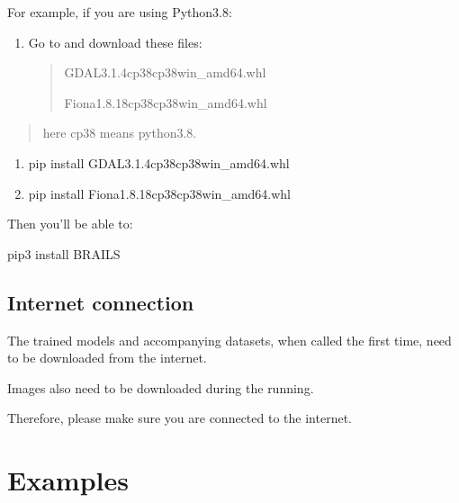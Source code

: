 \documentclass[letterpaper,10pt,english]{sphinxmanual}
\begin{document}
\sphinxAtStartPar
For example, if you are using Python3.8:
\begin{enumerate}
%
\item {} 
\sphinxAtStartPar
Go to  and download these files:
\begin{quote}

\sphinxAtStartPar
GDAL\sphinxhyphen{}3.1.4\sphinxhyphen{}cp38\sphinxhyphen{}cp38\sphinxhyphen{}win\_amd64.whl

\sphinxAtStartPar
Fiona\sphinxhyphen{}1.8.18\sphinxhyphen{}cp38\sphinxhyphen{}cp38\sphinxhyphen{}win\_amd64.whl
\end{quote}

\end{enumerate}
\begin{quote}

\sphinxAtStartPar
here cp38 means python3.8.
\end{quote}
\begin{enumerate}
%
\setcounter{enumi}{1}
\item {} 
\sphinxAtStartPar
pip install GDAL\sphinxhyphen{}3.1.4\sphinxhyphen{}cp38\sphinxhyphen{}cp38\sphinxhyphen{}win\_amd64.whl

\item {} 
\sphinxAtStartPar
pip install Fiona\sphinxhyphen{}1.8.18\sphinxhyphen{}cp38\sphinxhyphen{}cp38\sphinxhyphen{}win\_amd64.whl

\end{enumerate}

\sphinxAtStartPar
Then you’ll be able to:

\sphinxAtStartPar
pip3 install BRAILS


\subsection{Internet connection}
\label{\detokenize{common/user_manual/troubleshooting:internet-connection}}
\sphinxAtStartPar
The trained models and accompanying datasets, when called the first time, need to be downloaded from the internet.

\sphinxAtStartPar
Images also need to be downloaded during the running.

\sphinxAtStartPar
Therefore, please make sure you are connected to the internet.


\section{Examples}
\label{\detokenize{common/user_manual/examples:examples}}\label{\detokenize{common/user_manual/examples:lbl-examples}}\label{\detokenize{common/user_manual/examples::doc}}
\end{document}
